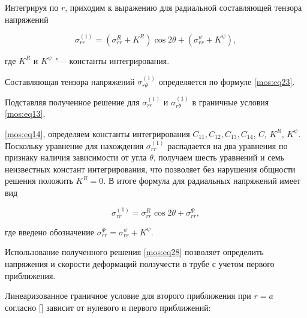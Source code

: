 Интегрируя по $r$, приходим к выражению для радиальной составляющей тензора напряжений

\begin{equation}

\label{mos:eq27}

\sigma_{rr}^{(1)}=(\sigma_{rr}^R+K^R)\cos{2\theta}+(\sigma_{rr}^\psi+K^\psi) ,

\end{equation}

где $K^R$ и $K^\psi$ "--- константы интегрирования.



Составляющая тензора напряжений $\sigma_{r\theta}^{(1)}$ определяется по формуле \eqref{mos:eq23}.



Подставляя полученное решение для $\sigma_{rr}^{(1)}$ и $\sigma_{r\theta}^{(1)}$ в граничные условия \eqref{mos:eq13},

\eqref{mos:eq14}, определяем константы интегрирования $C_{11}, C_{12},C_{13}, C_{14}$, $C$, $K^R$, $K^{\psi}$. Поскольку уравнение для нахождения $\sigma_{rr}^{(1)}$  распадается на два уравнения по признаку наличия зависимости от угла $\theta$, получаем шесть уравнений и семь неизвестных констант интегрирования, что позволяет без нарушения общности решения положить $K^R=0$. В итоге формула для радиальных напряжений имеет вид

\begin{equation}

\label{mos:eq28}

\sigma_{rr}^{(1)}=\sigma_{rr}^R\cos{2\theta}+\sigma_{rr}^\Psi ,

\end{equation}

где введено обозначение $\sigma_{rr}^\Psi=\sigma_{rr}^\psi+K^\psi$.



 Использование полученного решения \eqref{mos:eq28} позволяет определить напряжения и скорости деформаций ползучести в трубе с учетом первого приближения.





\smallskip




Линеаризованное граничное условие для второго приближения при $r=a$ согласно [] зависит от нулевого и первого приближений:

